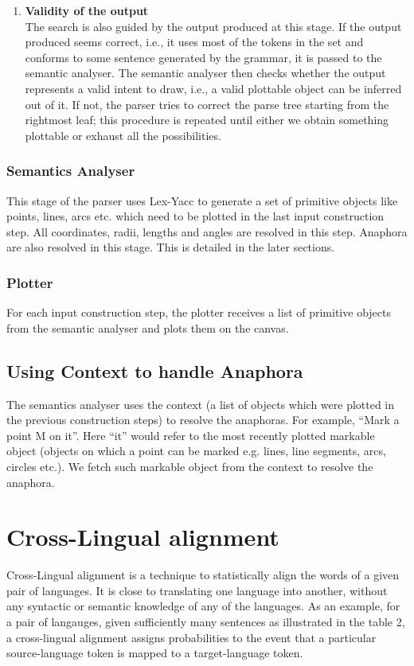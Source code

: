 \def\DevnagVersion{2.15}\documentclass[12pt]{article}
\begin{document}
\begin{enumerate}
\item \textbf{Validity of the output}\\
The search is also guided by the output produced at this stage. If the output produced seems correct, i.e., it uses most of the tokens in the set and conforms to some sentence generated by the grammar, it is passed to the semantic analyser. The semantic analyser then checks whether the output represents a valid intent to draw, i.e., a valid plottable object can be inferred out of it. If not, the parser tries to correct the parse tree starting from the rightmost leaf; this procedure is repeated until either we obtain something plottable or exhaust all the possibilities.

\end{enumerate}

\subsubsection{Semantics Analyser}
This stage of the parser uses Lex-Yacc to generate a set of primitive objects like points, lines, arcs etc. which need to be plotted in the last input construction step. All coordinates, radii, lengths and angles are resolved in this step. Anaphora are also resolved in this stage. This is detailed in the later sections.

\subsubsection{Plotter}
For each input construction step, the plotter receives a list of primitive objects from the semantic analyser and plots them on the canvas.

\subsection{Using Context to handle Anaphora}
The semantics analyser uses the context (a list of objects which were plotted in the previous construction steps) to resolve the anaphoras. For example,
``Mark a point M on it''.
Here ``it'' would refer to the most recently plotted markable object (objects on which a point can be marked e.g. lines, line segments, arcs, circles etc.). We fetch such markable object from the context to resolve the anaphora.

\section{Cross-Lingual alignment}
Cross-Lingual alignment is a technique to statistically align the words of a given pair of languages. It is close to translating one language into another, without any syntactic or semantic knowledge of any of the languages. As an example, for a pair of langauges, given sufficiently many sentences as illustrated in the table 2, a cross-lingual alignment assigns probabilities to the event that a particular source-language token is mapped to a target-language token.\\
\end{document}
